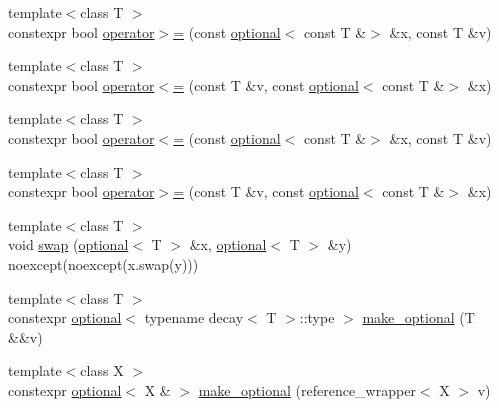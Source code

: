 \begin{DoxyCompactItemize}
\item 
{\footnotesize template$<$class T $>$ }\\constexpr bool \hyperlink{namespacestd_1_1experimental_a43c159cf8ffd0e172adbac601809aacd}{operator$>$=} (const \hyperlink{classstd_1_1experimental_1_1optional}{optional}$<$ const T \&$>$ \&x, const T \&v)
\item 
{\footnotesize template$<$class T $>$ }\\constexpr bool \hyperlink{namespacestd_1_1experimental_aca22cd45974dad371a24b9618f2d1b33}{operator$<$=} (const T \&v, const \hyperlink{classstd_1_1experimental_1_1optional}{optional}$<$ const T \&$>$ \&x)
\item 
{\footnotesize template$<$class T $>$ }\\constexpr bool \hyperlink{namespacestd_1_1experimental_afb3a1b869e0a3eb4840f37edf61ba0ef}{operator$<$=} (const \hyperlink{classstd_1_1experimental_1_1optional}{optional}$<$ const T \&$>$ \&x, const T \&v)
\item 
{\footnotesize template$<$class T $>$ }\\constexpr bool \hyperlink{namespacestd_1_1experimental_a943314dada174c65a0ac853cbdc89989}{operator$>$=} (const T \&v, const \hyperlink{classstd_1_1experimental_1_1optional}{optional}$<$ const T \&$>$ \&x)
\item 
{\footnotesize template$<$class T $>$ }\\void \hyperlink{namespacestd_1_1experimental_acdfba2d2e9c79f689a34c9cea5c5682d}{swap} (\hyperlink{classstd_1_1experimental_1_1optional}{optional}$<$ T $>$ \&x, \hyperlink{classstd_1_1experimental_1_1optional}{optional}$<$ T $>$ \&y) noexcept(noexcept(x.\+swap(y)))
\item 
{\footnotesize template$<$class T $>$ }\\constexpr \hyperlink{classstd_1_1experimental_1_1optional}{optional}$<$ typename decay$<$ T $>$\+::type $>$ \hyperlink{namespacestd_1_1experimental_aa6c8db3625ec5a8e7f6288fb5adf8f95}{make\+\_\+optional} (T \&\&v)
\item 
{\footnotesize template$<$class X $>$ }\\constexpr \hyperlink{classstd_1_1experimental_1_1optional}{optional}$<$ X \& $>$ \hyperlink{namespacestd_1_1experimental_a0f7b286ddf3bb6c4e95580898dcde37b}{make\+\_\+optional} (reference\+\_\+wrapper$<$ X $>$ v)
\end{DoxyCompactItemize}
